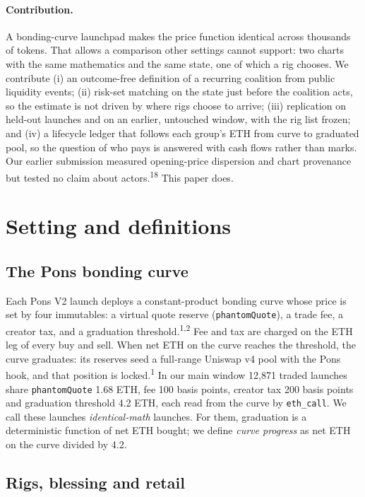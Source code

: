 \documentclass{ledger}
\newcommand{\n}[1]{\textsuperscript{#1}}
\begin{document}
\paragraph{Contribution.} A bonding-curve launchpad makes the price function identical across thousands of tokens. That allows a comparison other settings cannot support: two charts with the same mathematics and the same state, one of which a rig chooses. We contribute (i) an outcome-free definition of a recurring coalition from public liquidity events; (ii) risk-set matching on the state just before the coalition acts, so the estimate is not driven by where rigs choose to arrive; (iii) replication on held-out launches and on an earlier, untouched window, with the rig list frozen; and (iv) a lifecycle ledger that follows each group's ETH from curve to graduated pool, so the question of who pays is answered with cash flows rather than marks. Our earlier submission measured opening-price dispersion and chart provenance but tested no claim about actors.\n{18} This paper does.

\section{Setting and definitions}\label{setting}

\subsection{The Pons bonding curve}

Each Pons V2 launch deploys a constant-product bonding curve whose price is set by four immutables: a virtual quote reserve (\texttt{phantomQuote}), a trade fee, a creator tax, and a graduation threshold.\n{1,2} Fee and tax are charged on the ETH leg of every buy and sell. When net ETH on the curve reaches the threshold, the curve graduates: its reserves seed a full-range Uniswap v4 pool with the Pons hook, and that position is locked.\n{1} In our main window 12,871 traded launches share \texttt{phantomQuote} 1.68 ETH, fee 100 basis points, creator tax 200 basis points and graduation threshold 4.2 ETH, each read from the curve by \texttt{eth\_call}. We call these launches \emph{identical-math} launches. For them, graduation is a deterministic function of net ETH bought; we define \emph{curve progress} as net ETH on the curve divided by 4.2.

\subsection{Rigs, blessing and retail}
\end{document}
